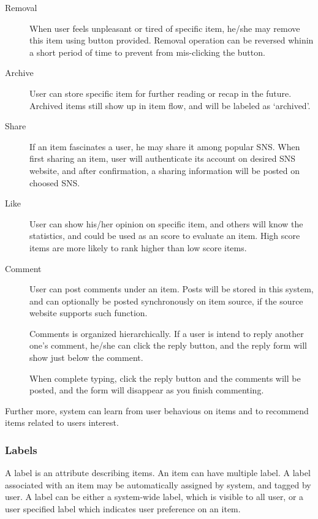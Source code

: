 \begin{description}
\item[Removal] \hfill

  When user feels unpleasant or tired of specific item, he/she
  may remove this item using button provided. Removal operation can be
  reversed whinin a short period of time to prevent from mis-clicking
  the button.
\item[Archive] \hfill

  User can store specific item for further reading or recap in
  the future. Archived items still show up in item flow, and will be
  labeled as `archived'.
\item[Share] \hfill

  If an item fascinates a user, he may share it among popular SNS.
  When first sharing an item, user will authenticate its account on
  desired SNS website, and after confirmation, a sharing information
  will be posted on choosed SNS.
\item[Like] \hfill

  User can show his/her opinion on specific item, and others will
  know the statistics, and could be used as an score to evaluate an
  item. High score items are more likely to rank higher than low score
  items.
\item[Comment] \hfill

  User can post comments under an item. Posts will be stored in
  this system, and can optionally be posted synchronously on item
  source, if the source website supports such function.

  Comments is organized hierarchically. If a user is intend to reply
  another one's comment, he/she can click the reply button, and the
  reply form will show just below the comment.

  When complete typing, click the reply button and the comments will be
  posted, and the form will disappear as you finish commenting.
\end{description}

Further more, system can learn from user behavious on items and to
recommend items related to users interest.

\subsubsection{Labels}

A label is an attribute describing items. An item can have multiple
label. A label associated with an item may be automatically assigned by
system, and tagged by user. A label can be either a system-wide label,
which is visible to all user, or a user specified label which indicates
user preference on an item.


